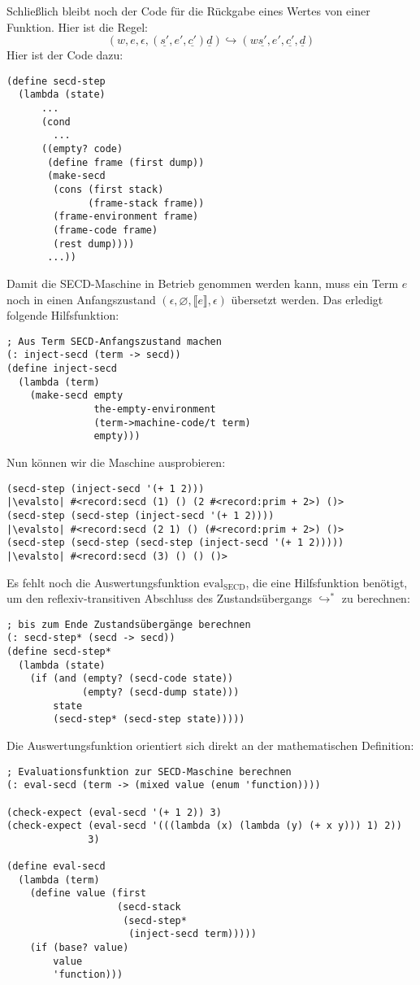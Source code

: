 %
Schließlich bleibt noch der Code für die Rückgabe eines Wertes von
einer Funktion.  Hier ist die Regel:
%
\begin{displaymath}
  (w, e, \epsilon, (\underline{s'}, e', \underline{c'}) \underline{d})
  \hookrightarrow
  (w\underline{s'}, e', \underline{c'}, \underline{d})
\end{displaymath}
%
Hier ist der Code dazu:
%
\begin{lstlisting}
(define secd-step
  (lambda (state)
      ...
      (cond
        ...
      ((empty? code)
       (define frame (first dump))
       (make-secd
        (cons (first stack)
              (frame-stack frame))
        (frame-environment frame)
        (frame-code frame)
        (rest dump))))
       ...))
\end{lstlisting}
%
Damit die SECD-Maschine in Betrieb genommen werden kann, muss ein Term
$e$ noch in einen Anfangszustand $(\epsilon, \varnothing, \llbracket
e\rrbracket, \epsilon)$ übersetzt werden.  Das erledigt folgende
Hilfsfunktion:
%
\begin{lstlisting}
; Aus Term SECD-Anfangszustand machen
(: inject-secd (term -> secd))
(define inject-secd
  (lambda (term)
    (make-secd empty
               the-empty-environment
               (term->machine-code/t term)
               empty)))
\end{lstlisting}
%
Nun können wir die Maschine ausprobieren:
%
\begin{lstlisting}
(secd-step (inject-secd '(+ 1 2)))
|\evalsto| #<record:secd (1) () (2 #<record:prim + 2>) ()>
(secd-step (secd-step (inject-secd '(+ 1 2))))
|\evalsto| #<record:secd (2 1) () (#<record:prim + 2>) ()>
(secd-step (secd-step (secd-step (inject-secd '(+ 1 2)))))
|\evalsto| #<record:secd (3) () () ()>
\end{lstlisting}
%
Es fehlt noch die Auswertungsfunktion $\mathrm{eval}_\mathrm{SECD}$,
die eine Hilfsfunktion benötigt, um den reflexiv-transitiven Abschluss des
Zustandsübergangs $\hookrightarrow^*$ zu berechnen:
%
\begin{lstlisting}
; bis zum Ende Zustandsübergänge berechnen
(: secd-step* (secd -> secd))
(define secd-step*
  (lambda (state)
    (if (and (empty? (secd-code state))
             (empty? (secd-dump state)))
        state
        (secd-step* (secd-step state)))))
\end{lstlisting}
%
Die Auswertungsfunktion orientiert sich direkt an der mathematischen
Definition:
%
\begin{lstlisting}
; Evaluationsfunktion zur SECD-Maschine berechnen
(: eval-secd (term -> (mixed value (enum 'function))))

(check-expect (eval-secd '(+ 1 2)) 3)
(check-expect (eval-secd '(((lambda (x) (lambda (y) (+ x y))) 1) 2))
              3)

(define eval-secd
  (lambda (term)
    (define value (first
                   (secd-stack
                    (secd-step* 
                     (inject-secd term)))))
    (if (base? value)
        value
        'function)))
\end{lstlisting}
